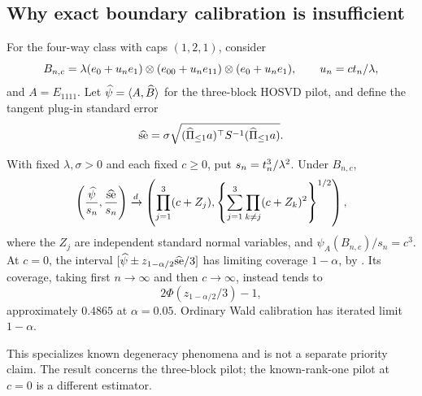 \subsection{Why exact boundary calibration is insufficient}
For the four-way class with caps $(1,2,1)$, consider
\[
 B_{n,c}=\lambda(e_0+u_ne_1)\otimes(e_{00}+u_ne_{11})
                    \otimes(e_0+u_ne_1),\qquad u_n=ct_n/\lambda,
\]
and $A=E_{1111}$. Let $\widehat\psi=\langle A,\widehat B\rangle$ for the three-block HOSVD pilot, and define the tangent plug-in standard error
\[
 \widehat{\rm se}=\sigma\sqrt{(\widehat\Pi_{\le1}a)^\top S^{-1}
                                      (\widehat\Pi_{\le1}a)}.
\]
\begin{proposition}\label{prop:wald}
With fixed $\lambda,\sigma>0$ and each fixed $c\ge0$, put $s_n=t_n^3/\lambda^2$. Under $B_{n,c}$,
\[
 \left(\frac{\widehat\psi}{s_n},\frac{\widehat{\rm se}}{s_n}\right)
 \xrightarrow{d}
 \left(\prod_{j=1}^3(c+Z_j),
 \left\{\sum_{j=1}^3\prod_{k\ne j}(c+Z_k)^2\right\}^{1/2}\right),
\]
where the $Z_j$ are independent standard normal variables, and $\psi_A(B_{n,c})/s_n=c^3$. At $c=0$, the interval $[\widehat\psi\pm z_{1-\alpha/2}\widehat{\rm se}/3]$ has limiting coverage $1-\alpha$, by \citet{pillaimeng2016}. Its coverage, taking first $n\to\infty$ and then $c\to\infty$, instead tends to
\[
 2\Phi(z_{1-\alpha/2}/3)-1,
\]
approximately $0.4865$ at $\alpha=0.05$. Ordinary Wald calibration has iterated limit $1-\alpha$.
\end{proposition}
This specializes known degeneracy phenomena and is not a separate priority claim. The result concerns the three-block pilot; the known-rank-one pilot at $c=0$ is a different estimator.
